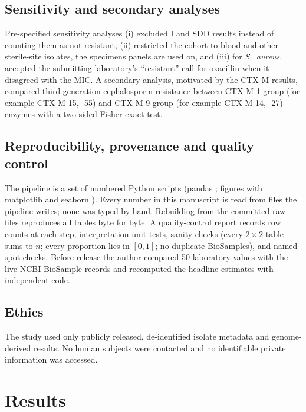 \documentclass[10pt,twocolumn,letterpaper]{article}
\newcommand{\sau}{\textit{S.~aureus}}
\begin{document}
\subsection{Sensitivity and secondary analyses}

Pre-specified sensitivity analyses (i) excluded I and SDD results instead of counting them as not resistant, (ii) restricted
the cohort to blood and other sterile-site isolates, the specimens panels are used on, and (iii) for \sau{}, accepted the
submitting laboratory's ``resistant'' call for oxacillin when it disagreed with the MIC. A secondary analysis, motivated by
the CTX-M results, compared third-generation cephalosporin resistance between CTX-M-1-group (for example CTX-M-15, -55)
and CTX-M-9-group (for example CTX-M-14, -27) enzymes \cite{bevan2017} with a two-sided Fisher exact test.

\subsection{Reproducibility, provenance and quality control}

The pipeline is a set of numbered Python scripts (pandas \cite{mckinney2010}; figures with matplotlib and seaborn
\cite{hunter2007,waskom2021}). Every number in this manuscript is read from files the pipeline writes; none was typed by
hand. Rebuilding from the committed raw files reproduces all tables byte for byte. A quality-control report records row
counts at each step, interpretation unit tests, sanity checks (every $2\times 2$ table sums to $n$; every proportion lies
in $[0,1]$; no duplicate BioSamples), and named spot checks. Before release the author compared 50 laboratory values with
the live NCBI BioSample records and recomputed the headline estimates with independent code.

\subsection{Ethics}

The study used only publicly released, de-identified isolate metadata and genome-derived results. No human subjects were
contacted and no identifiable private information was accessed.

\section{Results}\label{sec:results}
\end{document}
